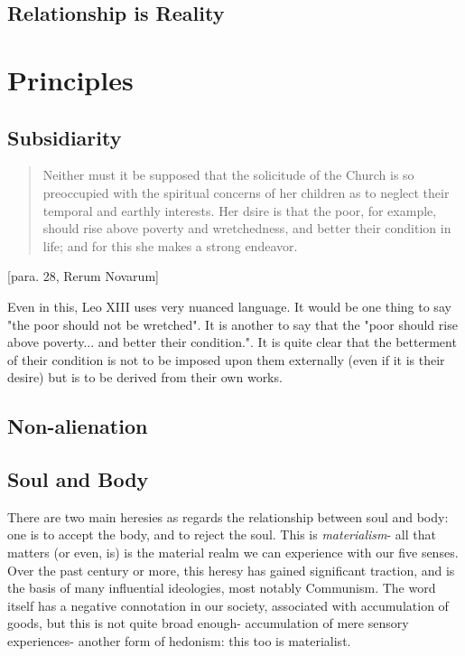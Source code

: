\documentclass[letterpaper]{article}
\begin{document}
\subsection{Relationship is Reality}

\section{Principles}

\subsection{Subsidiarity}

\begin{quote}
  Neither must it be supposed that the solicitude of the Church is so preoccupied with the spiritual concerns of her children as to neglect their temporal and earthly interests. Her dsire is that the poor, for example, should rise above poverty and wretchedness, and better their condition in life; and for this she makes a strong endeavor.
\end{quote} [para. 28, Rerum Novarum]

Even in this, Leo XIII uses very nuanced language. It would be one thing to say "the poor should not be wretched". It is another to say that the "poor should rise above poverty... and better their condition.".  It is quite clear that the betterment of their condition is not to be imposed upon them externally (even if it is their desire) but is to be derived from their own works.

\subsection{Non-alienation}

\subsection{Soul and Body}

There are two main heresies as regards the relationship between soul and body: one is to accept the body, and to reject the soul. This is \textit{materialism}- all that matters (or even, is) is the material realm we can experience with our five senses. Over the past century or more, this heresy has gained significant traction, and is the basis of many influential ideologies, most notably Communism. The word itself has a negative connotation in our society, associated with accumulation of goods, but this is not quite broad enough- accumulation of mere sensory experiences- another form of hedonism: this too is materialist.
\end{document}
